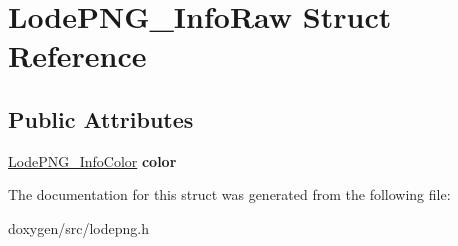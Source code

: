 \hypertarget{struct_lode_p_n_g___info_raw}{}\section{Lode\+P\+N\+G\+\_\+\+Info\+Raw Struct Reference}
\label{struct_lode_p_n_g___info_raw}
\subsection*{Public Attributes}
\begin{DoxyCompactItemize}
\item 
\mbox{\label{struct_lode_p_n_g___info_raw_ae9fa1c020358980be41f861ab71589fb}} 
\mbox{\hyperlink{struct_lode_p_n_g___info_color}{Lode\+P\+N\+G\+\_\+\+Info\+Color}} {\bfseries color}
\end{DoxyCompactItemize}


The documentation for this struct was generated from the following file\+:\begin{DoxyCompactItemize}
\item 
doxygen/src/lodepng.\+h\end{DoxyCompactItemize}
